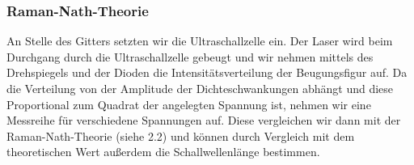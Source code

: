 \subsubsection{Raman-Nath-Theorie}

An Stelle des Gitters setzten wir die Ultraschallzelle ein. Der Laser wird beim Durchgang durch die Ultraschallzelle gebeugt und wir nehmen mittels des Drehspiegels und der Dioden die Intensitätsverteilung der Beugungsfigur auf. Da die Verteilung von der Amplitude der Dichteschwankungen abhängt und diese Proportional zum Quadrat der angelegten Spannung ist, nehmen wir eine Messreihe für verschiedene Spannungen auf. Diese vergleichen wir dann mit der Raman-Nath-Theorie (siehe 2.2) und können durch Vergleich mit dem theoretischen Wert außerdem die Schallwellenlänge bestimmen.

\clearpage










